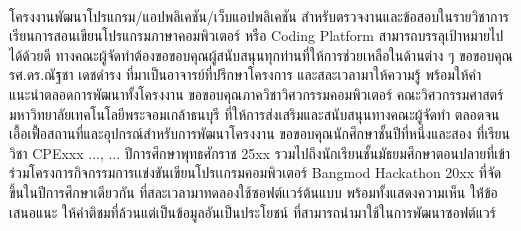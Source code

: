 \documentclass[12pt,one side,openright,a4paper]{cpe-thesis-th}
\begin{document}
\preface
{} \\
\justifying
โครงงานพัฒนาโปรแกรม/แอปพลิเคชัน/เว็บแอปพลิเคชัน สำหรับตรวจงานและข้อสอบในรายวิชาการเรียนการสอนเขียนโปรแกรมภาษาคอมพิวเตอร์ หรือ Coding Platform สามารถบรรลุเป้าหมายไปได้ด้วยดี ทางคณะผู้จัดทำต้องขอขอบคุณผู้สนับสนุนทุกท่านที่ให้การช่วยเหลือในด้านต่าง ๆ ขอขอบคุณ รศ.ดร.ณัฐชา เดชดำรง ที่มาเป็นอาจารย์ที่ปรึกษาโครงการ และสละเวลามาให้ความรู้ พร้อมให้คำแนะนำตลอดการพัฒนาทั้งโครงงาน ขอขอบคุณภาควิชาวิศวกรรมคอมพิวเตอร์ คณะวิศวกรรมศาสตร์ มหาวิทยาลัยเทคโนโลยีพระจอมเกล้าธนบุรี ที่ให้การส่งเสริมและสนับสนุนทางคณะผู้จัดทำ ตลอดจนเอื้อเฟื้อสถานที่และอุปกรณ์สำหรับการพัฒนาโครงงาน ขอขอบคุณนักศึกษาชั้นปีที่หนึ่งและสอง ที่เรียนวิชา CPExxx ..., ... ปีการศึกษาพุทธศักราช 25xx รวมไปถึงนักเรียนชั้นมัธยมศึกษาตอนปลายที่เข้าร่วมโครงการกิจกรรมการเเข่งขันเขียนโปรเเกรมคอมพิวเตอร์ Bangmod Hackathon 20xx ที่จัดขึ้นในปีการศึกษาเดียวกัน ที่สละเวลามาทดลองใช้ซอฟต์เเวร์ต้นแบบ พร้อมทั้งแสดงความเห็น ให้่ข้อเสนอแนะ ให้คำติชมที่ล้วนแต่เป็นข้อมูลอันเป็นประโยชน์ ที่สามารถนำมาใช้ในการพัฒนาซอฟต์แวร์


\def\appendixnames{ภาคผนวก} 

\tableofcontents                    
\listoftables
\listoffigures


\listofprograms


\listofsymbols
{}
\end{document}
